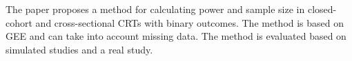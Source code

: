 \documentclass{article}
\begin{document}
\newpage


\section{\textcite{Wang:2021}}

The paper proposes a method for calculating power and sample size in closed-cohort and cross-sectional CRTs with binary outcomes. The method is based on GEE and can take into account missing data. The method is evaluated based on simulated studies and a real study.


\newpage


\printbibliography
\end{document}
